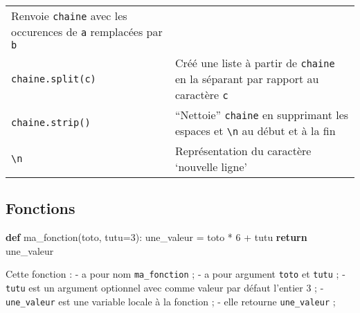 \documentclass[]{article}
\newenvironment{Shaded}{}{}
\newcommand{\ControlFlowTok}[1]{\textcolor[rgb]{0.00,0.44,0.13}{\textbf{#1}}}
\newcommand{\DecValTok}[1]{\textcolor[rgb]{0.25,0.63,0.44}{#1}}
\newcommand{\KeywordTok}[1]{\textcolor[rgb]{0.00,0.44,0.13}{\textbf{#1}}}
\newcommand{\NormalTok}[1]{#1}
\newcommand{\OperatorTok}[1]{\textcolor[rgb]{0.40,0.40,0.40}{#1}}
\begin{document}
\begin{longtable}[]{@{}ll@{}}
\begin{minipage}[t]{0.74\columnwidth}
Renvoie \texttt{chaine} avec les occurences de \texttt{a} remplacées par
\texttt{b}\strut
\end{minipage}\tabularnewline
\begin{minipage}[t]{0.20\columnwidth}\raggedright
\texttt{chaine.split(c)}\strut
\end{minipage} & \begin{minipage}[t]{0.74\columnwidth}\raggedright
Créé une liste à partir de \texttt{chaine} en la séparant par rapport au
caractère \texttt{c}\strut
\end{minipage}\tabularnewline
\begin{minipage}[t]{0.20\columnwidth}\raggedright
\texttt{chaine.strip()}\strut
\end{minipage} & \begin{minipage}[t]{0.74\columnwidth}\raggedright
``Nettoie'' \texttt{chaine} en supprimant les espaces et
\texttt{\textbackslash{}n} au début et à la fin\strut
\end{minipage}\tabularnewline
\begin{minipage}[t]{0.20\columnwidth}\raggedright
\texttt{\textbackslash{}n}\strut
\end{minipage} & \begin{minipage}[t]{0.74\columnwidth}\raggedright
Représentation du caractère `nouvelle ligne'\strut
\end{minipage}\tabularnewline
\bottomrule
\end{longtable}

\hypertarget{fonctions}{%
\subsection{Fonctions}\label{fonctions}}

\begin{Shaded}
\begin{Highlighting}[]
\KeywordTok{def}\NormalTok{ ma_fonction(toto, tutu}\OperatorTok{=}\DecValTok{3}\NormalTok{):}
\NormalTok{    une_valeur }\OperatorTok{=}\NormalTok{ toto }\OperatorTok{*} \DecValTok{6} \OperatorTok{+}\NormalTok{ tutu}
    \ControlFlowTok{return}\NormalTok{ une_valeur}
\end{Highlighting}
\end{Shaded}

Cette fonction : - a pour nom \texttt{ma\_fonction} ; - a pour argument
\texttt{toto} et \texttt{tutu} ; - \texttt{tutu} est un argument
optionnel avec comme valeur par défaut l'entier 3 ; -
\texttt{une\_valeur} est une variable locale à la fonction ; - elle
retourne \texttt{une\_valeur} ;
\end{document}
